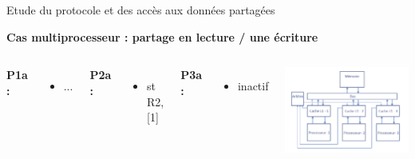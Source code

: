\documentclass{beamer}
\begin{document}
\begin{frame}{Etude du protocole et des accès aux données partagées}
    \addtocounter{framenumber}{-1}
    \textbf{Cas multiprocesseur : partage en lecture / une écriture}
    \begin{columns}[c] %

        \textbf{P1a : }
        \begin{itemize}
            \item ...
        \end{itemize}
        \textbf{P2a : }
        \begin{itemize}
            \item st R2, [1]
        \end{itemize}

        \textbf{P3a : }
        \begin{itemize}
            \item inactif
        \end{itemize}

        \vspace{1cm}
        \includegraphics[scale=0.3]{archi.png}
        
    \end{columns}
\end{frame}

\end{document}
